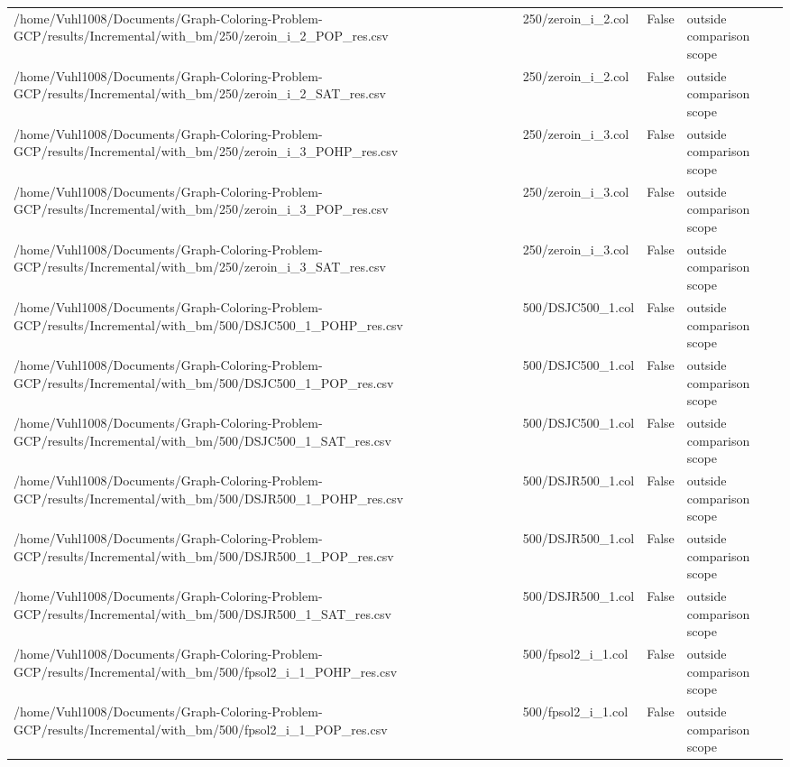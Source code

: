 \begin{table}[htbp]
\begin{tabular}{llll}
/home/Vuhl1008/Documents/Graph-Coloring-Problem-GCP/results/Incremental/with\_bm/250/zeroin\_i\_2\_POP\_res.csv & 250/zeroin\_i\_2.col & False & outside comparison scope \\
/home/Vuhl1008/Documents/Graph-Coloring-Problem-GCP/results/Incremental/with\_bm/250/zeroin\_i\_2\_SAT\_res.csv & 250/zeroin\_i\_2.col & False & outside comparison scope \\
/home/Vuhl1008/Documents/Graph-Coloring-Problem-GCP/results/Incremental/with\_bm/250/zeroin\_i\_3\_POHP\_res.csv & 250/zeroin\_i\_3.col & False & outside comparison scope \\
/home/Vuhl1008/Documents/Graph-Coloring-Problem-GCP/results/Incremental/with\_bm/250/zeroin\_i\_3\_POP\_res.csv & 250/zeroin\_i\_3.col & False & outside comparison scope \\
/home/Vuhl1008/Documents/Graph-Coloring-Problem-GCP/results/Incremental/with\_bm/250/zeroin\_i\_3\_SAT\_res.csv & 250/zeroin\_i\_3.col & False & outside comparison scope \\
/home/Vuhl1008/Documents/Graph-Coloring-Problem-GCP/results/Incremental/with\_bm/500/DSJC500\_1\_POHP\_res.csv & 500/DSJC500\_1.col & False & outside comparison scope \\
/home/Vuhl1008/Documents/Graph-Coloring-Problem-GCP/results/Incremental/with\_bm/500/DSJC500\_1\_POP\_res.csv & 500/DSJC500\_1.col & False & outside comparison scope \\
/home/Vuhl1008/Documents/Graph-Coloring-Problem-GCP/results/Incremental/with\_bm/500/DSJC500\_1\_SAT\_res.csv & 500/DSJC500\_1.col & False & outside comparison scope \\
/home/Vuhl1008/Documents/Graph-Coloring-Problem-GCP/results/Incremental/with\_bm/500/DSJR500\_1\_POHP\_res.csv & 500/DSJR500\_1.col & False & outside comparison scope \\
/home/Vuhl1008/Documents/Graph-Coloring-Problem-GCP/results/Incremental/with\_bm/500/DSJR500\_1\_POP\_res.csv & 500/DSJR500\_1.col & False & outside comparison scope \\
/home/Vuhl1008/Documents/Graph-Coloring-Problem-GCP/results/Incremental/with\_bm/500/DSJR500\_1\_SAT\_res.csv & 500/DSJR500\_1.col & False & outside comparison scope \\
/home/Vuhl1008/Documents/Graph-Coloring-Problem-GCP/results/Incremental/with\_bm/500/fpsol2\_i\_1\_POHP\_res.csv & 500/fpsol2\_i\_1.col & False & outside comparison scope \\
/home/Vuhl1008/Documents/Graph-Coloring-Problem-GCP/results/Incremental/with\_bm/500/fpsol2\_i\_1\_POP\_res.csv & 500/fpsol2\_i\_1.col & False & outside comparison scope \\

\end{tabular}
\end{table}
